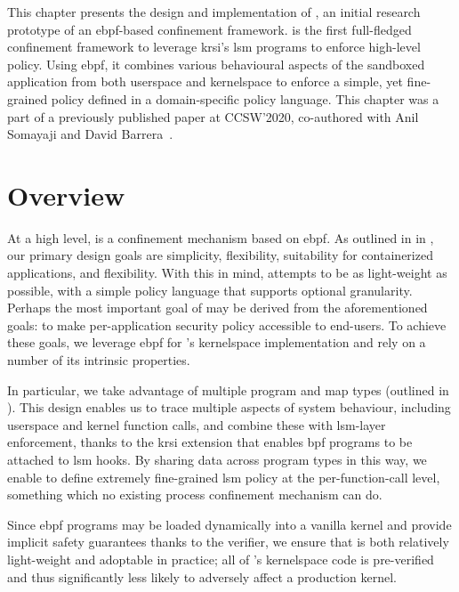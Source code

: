 This chapter presents the design and implementation of \bpfbox{}, an initial research
prototype of an \gls{ebpf}-based confinement framework. \bpfbox{} is the first
full-fledged confinement framework to leverage \gls{krsi}'s \gls{lsm} programs to enforce
high-level policy. Using \gls{ebpf}, it combines various behavioural aspects of the
sandboxed application from both userspace and kernelspace to enforce a simple, yet
fine-grained policy defined in a domain-specific policy language. This chapter was a part
of a previously published paper at CCSW'2020, co-authored with Anil Somayaji and David
Barrera~\cite{findlay2020_bpfbox}.



\section{\bpfbox{} Overview}

At a high level, \bpfbox{} is a confinement mechanism based on \gls{ebpf}. As outlined in
 in , our primary design goals are
simplicity, flexibility, suitability for containerized applications, and flexibility. With
this in mind, \bpfbox{} attempts to be as light-weight as possible, with a simple policy
language that supports optional granularity. Perhaps the most important goal of \bpfbox{}
may be derived from the aforementioned goals: to make per-application security policy
accessible to end-users. To achieve these goals, we leverage \gls{ebpf} for \bpfbox{}'s
kernelspace implementation and rely on a number of its intrinsic properties.

In particular, we take advantage of multiple program and map types (outlined in
). This design enables us to trace multiple aspects of system
behaviour, including userspace and kernel function calls, and combine these with
\gls{lsm}-layer enforcement, thanks to the \gls{krsi} extension that enables \gls{bpf}
programs to be attached to \gls{lsm} hooks. By sharing data across program types in this
way, we enable \bpfbox{} to define extremely fine-grained \gls{lsm} policy at the
per-function-call level, something which no existing process confinement mechanism can do.

Since \gls{ebpf} programs may be loaded dynamically into a vanilla kernel and provide
implicit safety guarantees thanks to the verifier, we ensure that \bpfbox{} is both
relatively light-weight and adoptable in practice; all of \bpfbox{}'s kernelspace code is
pre-verified and thus significantly less likely to adversely affect a production kernel.

